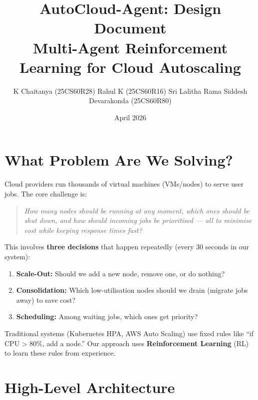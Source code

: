 \documentclass[11pt,a4paper]{article}
\title{\textbf{AutoCloud-Agent: Design Document}\\[6pt]
\large Multi-Agent Reinforcement Learning for Cloud Autoscaling}
\author{K Chaitanya (25CS60R28) \quad Rahul K (25CS60R16) \quad Sri Lalitha Rama Siddesh Devarakonda (25CS60R80)}
\date{April 2026}
\begin{document}
\maketitle
\tableofcontents
\newpage


\section{What Problem Are We Solving?}


Cloud providers run thousands of virtual machines (VMs/nodes) to serve user jobs.
The core challenge is:

\begin{quote}
\textit{How many nodes should be running at any moment, which ones should be
shut down, and how should incoming jobs be prioritised --- all to minimise cost
while keeping response times fast?}
\end{quote}

This involves \textbf{three decisions} that happen repeatedly (every 30 seconds in our system):

\begin{enumerate}[leftmargin=2em]
  \item \textbf{Scale-Out:} Should we add a new node, remove one, or do nothing?
  \item \textbf{Consolidation:} Which low-utilisation nodes should we drain
        (migrate jobs away) to save cost?
  \item \textbf{Scheduling:} Among waiting jobs, which ones get priority?
\end{enumerate}

Traditional systems (Kubernetes HPA, AWS Auto Scaling) use fixed rules like
``if CPU > 80\%, add a node.'' Our approach uses \textbf{Reinforcement Learning}
(RL) to learn these rules from experience.


\section{High-Level Architecture}
\end{document}
